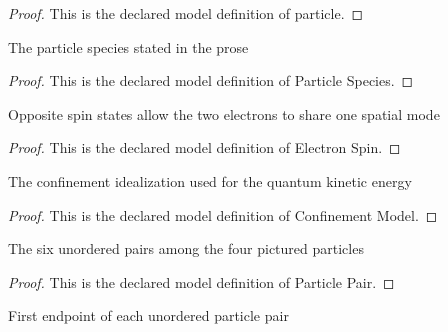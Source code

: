 \begin{proof}
  This is the declared model definition of particle.
\end{proof}
\begin{definition}
  \label{def:physics:phyx-mini-0535:phyxminiproblems-problemphyxmini0535-particlespecies}
  The particle species stated in the prose
\end{definition}
\begin{proof}
  This is the declared model definition of Particle Species.
\end{proof}
\begin{definition}
  \label{def:physics:phyx-mini-0535:phyxminiproblems-problemphyxmini0535-electronspin}
  Opposite spin states allow the two electrons to share one spatial mode
\end{definition}
\begin{proof}
  This is the declared model definition of Electron Spin.
\end{proof}
\begin{definition}
  \label{def:physics:phyx-mini-0535:phyxminiproblems-problemphyxmini0535-confinementmodel}
  The confinement idealization used for the quantum kinetic energy
\end{definition}
\begin{proof}
  This is the declared model definition of Confinement Model.
\end{proof}
\begin{definition}
  \label{def:physics:phyx-mini-0535:phyxminiproblems-problemphyxmini0535-particlepair}
  The six unordered pairs among the four pictured particles
\end{definition}
\begin{proof}
  This is the declared model definition of Particle Pair.
\end{proof}
\begin{definition}[first]
  \label{def:physics:phyx-mini-0535:phyxminiproblems-problemphyxmini0535-particlepair-first}
  First endpoint of each unordered particle pair
\end{definition}
